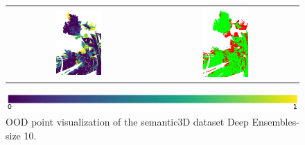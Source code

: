 \begin{figure}[h!]
\begin{tabular}{cc}
                \includegraphics[width=0.33\textwidth, height=0.18\textheight]{images/ood_imgs/de_sem3d/de_ent_10_3.png}& 
                \includegraphics[width=0.33\textwidth, height=0.18\textheight]{images/ood_imgs/de_sem3d/de_ent_ood_auroc_3.png}\\
            \end{tabular}
            \includegraphics[scale=0.45]{images/prob_legend.pdf}
            \caption{OOD point visualization of the semantic3D dataset Deep Ensembles-size 10.}
            \label{fig:de_ood_auroc_sem3d_ent}
        \end{figure}

